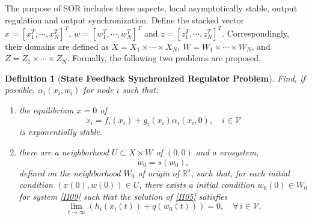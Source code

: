 \documentclass[onecolumn,a4paper,12pt]{article}
\newcommand{\real}{\mathbb{R}}
\newtheorem{definition}{Definition}
\numberwithin{equation}{section}
\begin{document}
The purpose of SOR includes three aspects, local asymptotically stable, output regulation and output synchronization. Define the stacked vector $x=[x_1^T,\cdots,x_N^T]^T$, $w=[w_1^T,\cdots,w_N^T]^T$ and $z=[z_1^T,\cdots,z_N^T]^T$. Correspondingly, their domains are defined as $X=X_1\times\cdots\times X_N$, $W=W_1\times\cdots\times W_N$, and $Z=Z_1\times\cdots\times Z_N$. Formally, the following two problems are proposed,
\begin{definition}
  [\textbf{State Feedback Synchronized Regulator Problem}] Find, if possible, $\alpha_i(x_i,w_i)$ for node $i$ such that:
  \begin{enumerate}
    \item [1a)] the equilibrium $x=0$ of
    \begin{equation}  \label{II08}
      \dot{x}_i = f_i(x_i)+g_i(x_i)\alpha_i(x_i,0), \quad i\in\mathcal{V}
    \end{equation}
    is exponentially stable.
    \item [1b)] there are a neighborhood $U\subset X\times W$ of $(0,0)$ and a exosystem,
    \begin{equation} \label{II09}
      \dot{w}_0=s(w_0),
    \end{equation}
    defined on the neighborhood $W_0$ of origin of $\real^{s}$, such that, for each initial condition $(x(0),w(0))\in U$, there exists a initial condition $w_0(0)\in W_0$ for system \eqref{II09} such that the solution of \eqref{II05} satisfies
    \begin{equation}
      \label{II10}
      \lim_{t\rightarrow \infty} (h_i(x_i(t))+q(w_0(t))) = 0, \quad \forall\, i\in\mathcal{V}.
    \end{equation}
  \end{enumerate}
\end{definition}
\end{document}
